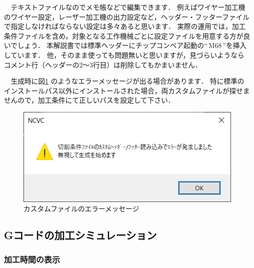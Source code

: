 \vspace*{2zh}
　テキストファイルなのでメモ帳などで編集できます．
例えばワイヤー加工機のワイヤー設定，レーザー加工機の出力設定など，ヘッダー・フッターファイルで指定しなければならない設定は多々あると思います．
実際の運用では，加工条件ファイルを含め，対象となる工作機械ごとに設定ファイルを用意する方が良いでしょう．
本解説書では標準ヘッダーにチップコンベア起動の``\,M68\,''を挿入しています．
他，そのまま使っても問題無いと思いますが，見づらいようならコメント行（ヘッダーの2～3行目）は削除してもかまいません．

　生成時に図\ref{fig:error.png} のようなエラーメッセージが出る場合があります．
特に標準のインストールパス以外にインストールされた場合，両カスタムファイルが探せませんので，加工条件にて正しいパスを設定して下さい．

\begin{figure}[H]
\centering
\includegraphics{No2/fig/error.png}
\caption{カスタムファイルのエラーメッセージ}
\label{fig:error.png}
\end{figure}

\subsection{Gコードの加工シミュレーション}

\subsubsection{加工時間の表示}

